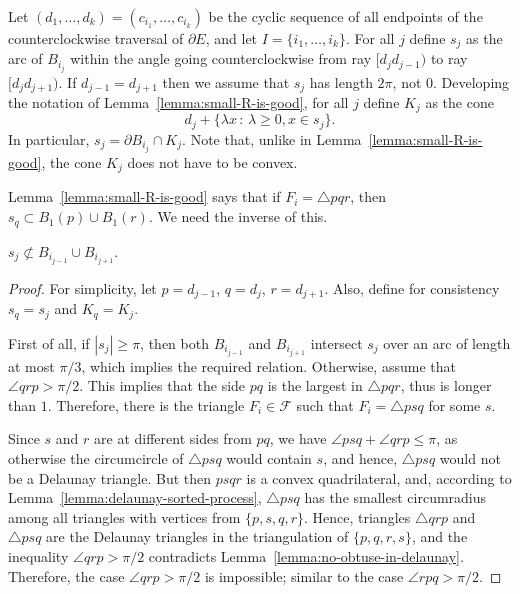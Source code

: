 \begin{appendices}
Let $(d_1, \ldots, d_k) = (c_{i_1}, \ldots, c_{i_k})$ be the cyclic sequence of all endpoints of the counterclockwise traversal of $\partial{E}$, and let $I = \{i_1, \ldots, i_k\}$.
For all $j$ define $s_j$ as the arc of $B_{i_j}$ within the angle going counterclockwise from ray $[d_jd_{j-1})$ to ray $[d_jd_{j+1})$. If $d_{j-1} = d_{j+1}$ then we assume that $s_j$ has length $2\pi$, not $0$.
Developing the notation of Lemma~\ref{lemma:small-R-is-good}, for all $j$ define $K_j$ as the cone
$$d_j + \{\lambda x\,\colon\,\lambda\geq 0, x\in s_j\}.$$
In particular, $s_j = \partial B_{i_j}\cap K_j$. Note that, unlike in Lemma~\ref{lemma:small-R-is-good}, the cone $K_j$ does not have to be convex.

Lemma~\ref{lemma:small-R-is-good} says that if $F_i = \triangle pqr$, then $s_q\subset B_1(p)\cup B_1(r)$. We need the inverse of this.

\begin{lemma}\label{lemma:covered-arc-implies-small-R}
$s_j\not\subset B_{i_{j-1}}\cup B_{i_{j+1}}$.
\end{lemma}

\begin{proof}
For simplicity, let $p = d_{j-1}$, $q = d_j$, $r = d_{j+1}$. Also, define for consistency $s_q = s_j$ and $K_q = K_j$.

First of all, if $|s_j|\geq\pi$, then both $B_{i_{j-1}}$ and $B_{i_{j+1}}$ intersect $s_j$ over an arc of length at most $\pi/3$, which implies the required relation. Otherwise, assume that $\angle qrp > \pi/2$. This implies that the side $pq$ is the largest in $\triangle pqr$, thus is longer than $1$. Therefore, there is the triangle $F_i\in\mathcal{F}$ such that $F_i = \triangle psq$ for some $s$.

Since $s$ and $r$ are at different sides from $pq$, we have $\angle psq + \angle qrp\leq\pi$, as otherwise the circumcircle of $\triangle psq$ would contain $s$, and hence, $\triangle psq$ would not be a Delaunay triangle. But then $psqr$ is a convex quadrilateral, and, according to Lemma~\ref{lemma:delaunay-sorted-process}, $\triangle psq$ has the smallest circumradius among all triangles with vertices from $\{p, s, q, r\}$. Hence, triangles $\triangle qrp$ and $\triangle psq$ are the Delaunay triangles in the triangulation of $\{p, q, r, s\}$, and the inequality $\angle qrp > \pi/2$ contradicts Lemma~\ref{lemma:no-obtuse-in-delaunay}. Therefore, the case $\angle qrp > \pi/2$ is impossible; similar to the case $\angle rpq > \pi/2$.


\end{proof}
\end{appendices}
